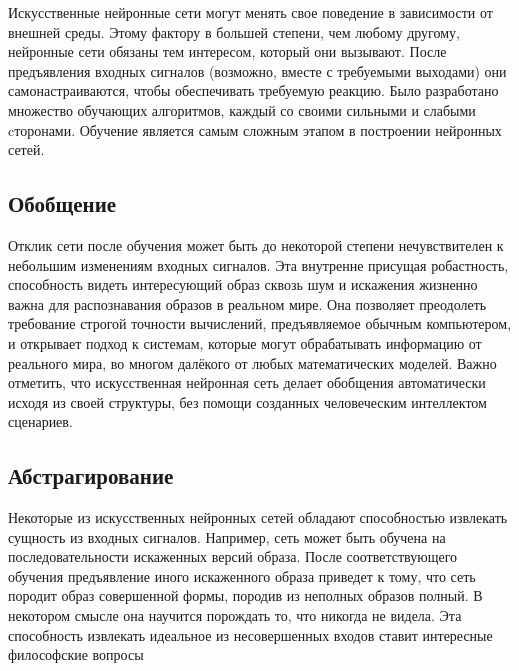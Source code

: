 \documentclass[a4paper,12pt]{report}
\begin{document}
Искусственные нейронные сети могут менять свое поведение в зависимости от внешней среды. Этому фактору в большей степени, чем любому другому, нейронные сети обязаны тем интересом, который они вызывают. После предъявления входных сигналов (возможно, вместе с требуемыми выходами) они самонастраиваются, чтобы обеспечивать требуемую реакцию. Было разработано множество обучающих алгоритмов, каждый со своими сильными и слабыми cторонами. Обучение является самым сложным этапом в построении нейронных сетей.

\subsection{Обобщение}

Отклик сети после обучения может быть до некоторой степени нечувствителен к небольшим изменениям входных сигналов. Эта внутренне присущая робастность, способность видеть интересующий образ сквозь шум и искажения жизненно важна для распознавания образов в реальном мире. Она позволяет преодолеть требование строгой точности вычислений, предъявляемое обычным компьютером, и открывает подход к системам, которые могут обрабатывать информацию от реального мира, во многом далёкого от любых математических моделей. Важно отметить, что искусственная нейронная сеть делает обобщения автоматически исходя из своей структуры, без помощи созданных человеческим интеллектом сценариев.


\subsection{Абстрагирование}
Некоторые из искусственных нейронных сетей обладают способностью извлекать сущность из входных сигналов. Например, сеть может быть обучена на последовательности искаженных версий образа. После соответствующего обучения предъявление иного искаженного образа приведет к тому, что сеть породит образ совершенной формы, породив из неполных образов полный. В некотором смысле она научится порождать то, что никогда не видела. Эта способность извлекать идеальное из несовершенных входов ставит интересные философские вопросы
\end{document}
